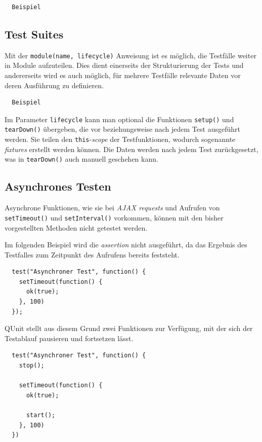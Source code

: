 \documentclass[11pt, a4paper]{article}
\begin{document}
\begin{verbatim}
  Beispiel
\end{verbatim}

\subsection{Test Suites}

Mit der \texttt{module(name, lifecycle)} Anweisung ist es möglich, die Testfälle
weiter in Module aufzuteilen. Dies dient einerseits der Strukturierung der Tests
und andererseits wird es auch möglich, für mehrere Testfälle relevante Daten vor
deren Ausführung zu definieren.

\begin{verbatim}
  Beispiel
\end{verbatim}

Im Parameter \texttt{lifecycle} kann man optional die Funktionen
\texttt{setup()} und \texttt{tearDown()} übergeben, die vor beziehungsweise nach
jedem Test ausgeführt werden. Sie teilen den \texttt{this}-\emph{scope} der
Testfunktionen, wodurch sogenannte \emph{fixtures} erstellt werden können. Die
Daten werden nach jedem Test zurückgesetzt, was in \texttt{tearDown()} auch
manuell geschehen kann.

\subsection{Asynchrones Testen}

Asynchrone Funktionen, wie sie bei \emph{AJAX requests} und Aufrufen von
\texttt{setTimeout()} und \texttt{setInterval()} vorkommen, können mit den
bisher vorgestellten Methoden nicht getestet werden.

Im folgenden Beispiel\cite{huang_how_2010} wird die \emph{assertion} nicht ausgeführt, da das
Ergebnis des Testfalles zum Zeitpunkt des Aufrufens bereits feststeht.

\begin{verbatim}
  test("Asynchroner Test", function() {
    setTimeout(function() {
      ok(true);
    }, 100)
  });
\end{verbatim}

QUnit stellt aus diesem Grund zwei Funktionen zur Verfügung, mit der
sich der Testablauf pausieren und fortsetzen lässt.

\begin{verbatim}
  test("Asynchroner Test", function() {
    stop();

    setTimeout(function() {
      ok(true);

      start();
    }, 100)
  })
\end{verbatim}
\end{document}
